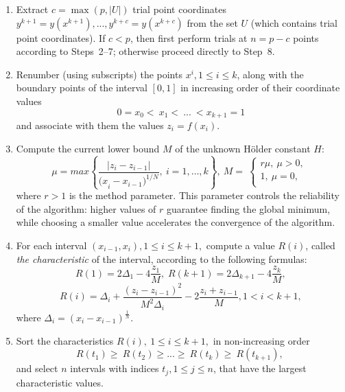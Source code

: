 \documentclass[runningheads]{llncs}
\begin{document}
\begin{enumerate}
	
	\item Extract $c = \max(p, |U|)$ trial point coordinates $y^{k+1}=y\left(x^{k+1}\right),...,y^{k+c}=y\left(x^{k+c}\right)$ from the set $U$ (which contains trial point coordinates). If $c < p$, then first perform trials at $n = p - c$ points according to Steps~2--7; otherwise proceed directly to Step~8.
	
	\item Renumber (using subscripts) the points $x^i, 1\leq i\leq k$,  along with the boundary points of the interval $[0, 1]$ in increasing order of their coordinate values
	\begin{equation} 
		\label{agp1_sort} 	0=x_0<\ x_1<\ ...\ <x_{k+1}=1 	
	\end{equation} 
	and associate with them the values $z_i=f(x_i)$. 
	
	\item  Compute the current lower bound $M$ of the unknown Hölder constant $H$: 
	\begin{equation} 
		\label{agp2_mu} 	\mu=max\left\{\frac{|z_i-z_{i-1}|}{{{(x}_i-x_{i-1})}^{1/N}},\ i=1,\ldots,k\right\},\ M=\  \left\{\begin{matrix}r\mu,\ \mu>0,\\1,\ \mu=0,\\\end{matrix}\right.\ 	
	\end{equation} 
	where $r>1$ is the method parameter. This parameter controls the reliability of the algorithm: higher values of $r$ guarantee finding the global minimum, while choosing a smaller value accelerates the convergence of the algorithm.
	
	\item  For each interval $(x_{i-1},x_i), 1\leq i\leq k+1,$ compute a value $R(i)$, called \textit{the characteristic} of the interval, according to the following formulas:
	\begin{equation} 
		\label{agp3_R1} R(1)=2\Delta_1-4\dfrac{z_1}{M}, \; R(k+1)=2\Delta_{k+1}-4\dfrac{z_k}{M}, 
	\end{equation} 
	\begin{equation} 
		\label{agp3_Ri} R(i)=\Delta_i+\dfrac{(z_i-z_{i-1})^2}{M^2\Delta_i}-2\dfrac{z_i+z_{i-1}}{M},1<i<k+1, 
	\end{equation} 
	where \(\Delta_i=(x_i-x_{i-1})^\frac{1}{N}\).
	
	\item   Sort the characteristics  $R\left(i\right),\ 1\leq i \leq k+1,$  in non-increasing order
	\begin{equation} 
		\label{agp4_R_sort} 	R\left(t_1\right)\geq\ R\left(t_2\right)\geq...\geq\ R\left(t_k\right)\geq\ R(t_{k+1}),\  
	\end{equation} 
and select $n$ intervals with indices $t_j, 1 \le j \le n$, that have the largest characteristic values.	
	

\end{enumerate}
\end{document}
